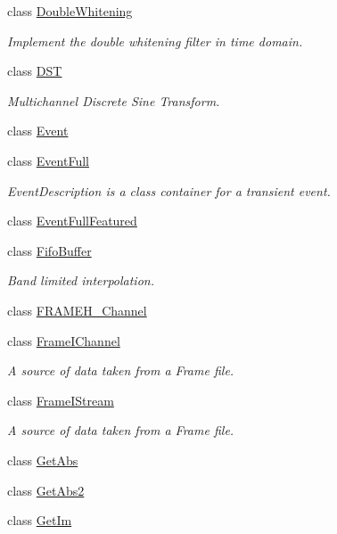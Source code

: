 \begin{DoxyCompactItemize}
class \hyperlink{classtsa_1_1_double_whitening}{Double\+Whitening}
\begin{DoxyCompactList}\small\item\em Implement the double whitening filter in time domain. \end{DoxyCompactList}\item 
class \hyperlink{classtsa_1_1_d_s_t}{D\+ST}
\begin{DoxyCompactList}\small\item\em Multichannel Discrete Sine Transform. \end{DoxyCompactList}\item 
class \hyperlink{classtsa_1_1_event}{Event}
\item 
class \hyperlink{classtsa_1_1_event_full}{Event\+Full}
\begin{DoxyCompactList}\small\item\em Event\+Description is a class container for a transient event. \end{DoxyCompactList}\item 
class \hyperlink{classtsa_1_1_event_full_featured}{Event\+Full\+Featured}
\item 
class \hyperlink{classtsa_1_1_fifo_buffer}{Fifo\+Buffer}
\begin{DoxyCompactList}\small\item\em Band limited interpolation. \end{DoxyCompactList}\item 
class \hyperlink{classtsa_1_1_f_r_a_m_e_h___channel}{F\+R\+A\+M\+E\+H\+\_\+\+Channel}
\item 
class \hyperlink{classtsa_1_1_frame_i_channel}{Frame\+I\+Channel}
\begin{DoxyCompactList}\small\item\em A source of data taken from a Frame file. \end{DoxyCompactList}\item 
class \hyperlink{classtsa_1_1_frame_i_stream}{Frame\+I\+Stream}
\begin{DoxyCompactList}\small\item\em A source of data taken from a Frame file. \end{DoxyCompactList}\item 
class \hyperlink{classtsa_1_1_get_abs}{Get\+Abs}
\item 
class \hyperlink{classtsa_1_1_get_abs2}{Get\+Abs2}
\item 
class \hyperlink{classtsa_1_1_get_im}{Get\+Im}
\item 

\end{DoxyCompactItemize}

